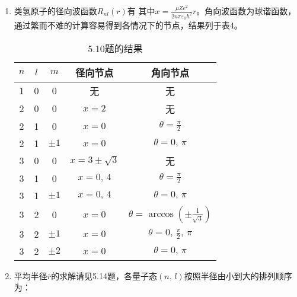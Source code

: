 \begin{enumerate}[label=\textbf{5.\arabic*}, listparindent=\parindent]
\item 类氢原子的径向波函数$R_{nl}(r)$有
其中$x=\frac{\mu Ze^2}{2n\pi\varepsilon_0\hbar^2}r$。角向波函数为球谐函数，
通过繁而不难的计算容易得到各情况下的节点，结果列于表4。
\begin{table}[h]
    \centering
    \begin{tabular}{ccc|c|c}
    \hline
        $n$ & $l$ & $m$ & 径向节点 & 角向节点 \\
        \hline
        1 & 0 & 0 & 无 & 无 \\
        \hline
        2 & 0 & 0 & $x=2$ & 无 \\
        2 & 1 & 0 & $x=0$ & $\theta=\frac{\pi}{2}$ \\
        2 & 1 & $\pm1$ & $x=0$ & $\theta=0,\,\pi$ \\
        \hline
        3 & 0 & 0 & $x=3\pm\sqrt{3}$ & 无 \\
        3 & 1 & 0 & $x=0,\,4$ & $\theta=\frac{\pi}{2}$ \\
        3 & 1 & $\pm1$ & $x=0,\,4$ & $\theta=0,\,\pi$ \\
        \hline
        3 & 2 & 0 & $x=0$ & $\theta=\arccos(\pm\frac{1}{\sqrt{3}})$ \\
        3 & 2 & $\pm1$ & $x=0$ & $\theta=0,\,\frac{\pi}{2},\,\pi$ \\
        3 & 2 & $\pm2$ & $x=0$ & $\theta=0,\,\pi$\\
        \hline
    \end{tabular}
    \caption{5.10题的结果}
    \label{tab:my_label}
\end{table}

\item 平均半径$\bar{r}$的求解请见5.14题，各量子态$(n,\,l)$按照半径由小到大的排列顺序为：


\end{enumerate}
